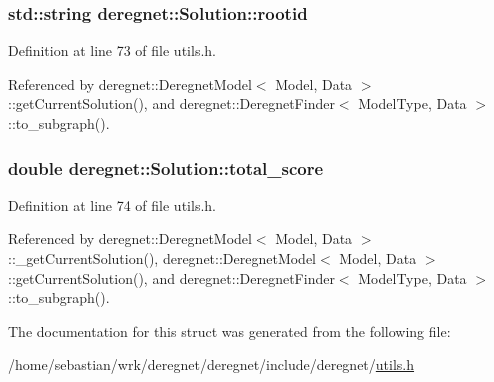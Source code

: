 \subsubsection[{\texorpdfstring{rootid}{rootid}}]{\setlength{\rightskip}{0pt plus 5cm}std\+::string deregnet\+::\+Solution\+::rootid}\hypertarget{structderegnet_1_1Solution_a1aca697c0ec5e039837094cb45731215}{}\label{structderegnet_1_1Solution_a1aca697c0ec5e039837094cb45731215}


Definition at line 73 of file utils.\+h.



Referenced by deregnet\+::\+Deregnet\+Model$<$ Model, Data $>$\+::get\+Current\+Solution(), and deregnet\+::\+Deregnet\+Finder$<$ Model\+Type, Data $>$\+::to\+\_\+subgraph().

\subsubsection[{\texorpdfstring{total\+\_\+score}{total_score}}]{\setlength{\rightskip}{0pt plus 5cm}double deregnet\+::\+Solution\+::total\+\_\+score}\hypertarget{structderegnet_1_1Solution_af2e4901767f70d22b41acafa8cfb62d2}{}\label{structderegnet_1_1Solution_af2e4901767f70d22b41acafa8cfb62d2}


Definition at line 74 of file utils.\+h.



Referenced by deregnet\+::\+Deregnet\+Model$<$ Model, Data $>$\+::\+\_\+get\+Current\+Solution(), deregnet\+::\+Deregnet\+Model$<$ Model, Data $>$\+::get\+Current\+Solution(), and deregnet\+::\+Deregnet\+Finder$<$ Model\+Type, Data $>$\+::to\+\_\+subgraph().



The documentation for this struct was generated from the following file\+:\begin{DoxyCompactItemize}
\item 
/home/sebastian/wrk/deregnet/deregnet/include/deregnet/\hyperlink{utils_8h}{utils.\+h}\end{DoxyCompactItemize}
